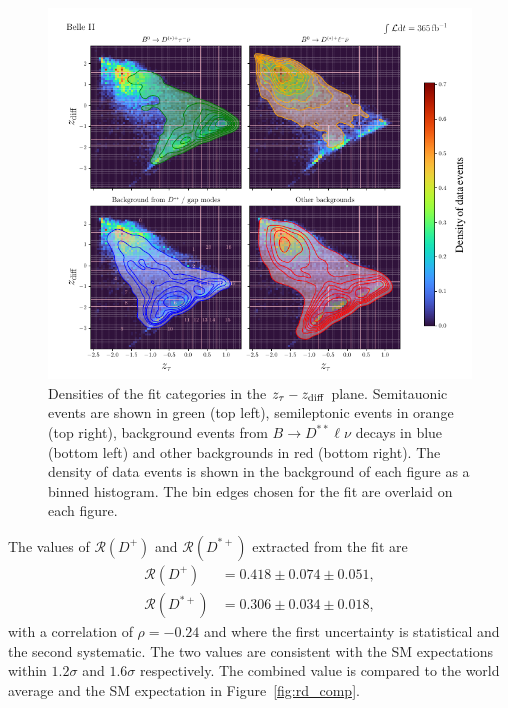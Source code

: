 \documentclass{moriond}
\def\bea{\begin{eqnarray}}
\def\eea{\end{eqnarray}}
\def\zdiff{z_{\rm diff}}
\def\rdp{\mathcal{R}\left(D^+\right)}
\def\rdstp{\mathcal{R}\left(D^{*+}\right)}
\begin{document}
\begin{figure}[h!]
    \centering
    \includegraphics[scale=0.8]{Figures/2d_rd.pdf}
    \caption{Densities of the fit categories in the $z_\tau-\zdiff$ plane. Semitauonic events are shown in green (top left), semileptonic events in orange (top right), background events from $B \to D^{**}\ell\nu$ decays in blue (bottom left) and other backgrounds in red (bottom right). The density of data events is shown in the background of each figure as a binned histogram. The bin edges chosen for the fit are overlaid on each figure.}
    \label{fig:2d_rd}
\end{figure}
The values of $\rdp$ and $\rdstp$ extracted from the fit are
\bea
    \rdp &= 0.418 \pm 0.074 \pm 0.051, \\
    \rdstp &= 0.306 \pm 0.034 \pm 0.018,
\eea
with a correlation of $\rho = -0.24$ and where the first uncertainty is statistical and the second systematic. The two values are consistent with the SM expectations within $1.2\sigma$ and $1.6\sigma$ respectively. The combined value is compared to the world average and the SM expectation in Figure~\ref{fig:rd_comp}.
\end{document}
